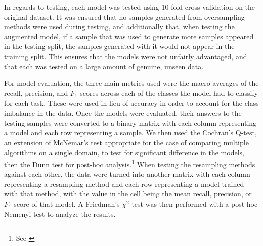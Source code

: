 \documentclass[runningheads]{llncs}
\begin{document}
In regards to testing, each model was tested using 10-fold cross-validation on the original dataset. It was ensured that no samples generated from oversampling methods were used during testing, and additionally that, when testing the augmented model, if a sample that was used to generate more samples appeared in the testing split, the samples generated with it would not appear in the training split. This ensures that the models were not unfairly advantaged, and that each was tested on a large amount of genuine, unseen data.

For model evaluation, the three main metrics used were the macro-averages of the recall, precision, and $F_1$ scores across each of the classes the model had to classify for each task. These were used in lieu of accuracy in order to account for the class imbalance in the data. Once the models were evaluated, their answers to the testing samples were converted to a binary matrix with each column representing a model and each row representing a sample. We then used the Cochran's Q-test, an extension of McNemar's test appropriate for the case of comparing multiple algorithms on a single domain, to test for significant difference in the models, then the Dunn test for post-hoc analysis.\footnote{See \cite{boukouvalas}} When testing the resampling methods against each other, the data were turned into another matrix with each column representing a resampling method and each row representing a model trained with that method, with the value in the cell being the mean recall, precision, or $F_1$ score of that model. A Friedman's $\chi^2$ test was then performed with a post-hoc Nemenyi test to analyze the results.
\end{document}
